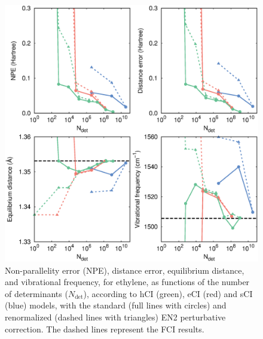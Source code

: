 \documentclass[aip,jcp,preprint,noshowkeys,superscriptaddress]{revtex4-1}
\newcommand{\Ndet}{N_\text{det}}
\begin{document}
\begin{figure}%
\includegraphics[width=1.0\linewidth]{plot_pt2_rpt2_ethylene}
\caption{
Non-parallelity error (NPE), distance error, equilibrium distance, and vibrational frequency, for ethylene,
as functions of the number of determinants ($\Ndet$), according to hCI (green), eCI (red) and sCI (blue) models,
with the standard (full lines with circles) and renormalized (dashed lines with triangles) EN2 perturbative correction.
The dashed lines represent the FCI results.}
\label{fig:plot_pt2_rpt2_ethylene}
\end{figure}
\end{document}
